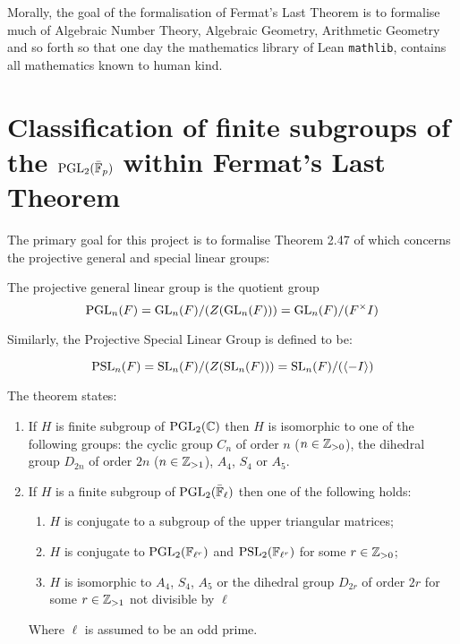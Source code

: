 Morally, the goal of the formalisation of Fermat's Last Theorem is to formalise much of Algebraic Number Theory, Algebraic Geometry, Arithmetic Geometry and so forth so that one day
the mathematics library of Lean \texttt{mathlib}, contains all mathematics known to human kind.



\section{Classification of finite subgroups of the $\operatorname{PGL}_2(\bar{\mathbb{F}}_p)$ within Fermat's Last Theorem}

The primary goal for this project is to formalise Theorem 2.47 of \cite{dtt} which 
concerns the projective general and special linear groups:

\begin{definition}
    The projective general linear group is the quotient group
    \[    
    \operatorname{PGL}_n(F) = \operatorname{GL}_n(F) / (Z(\operatorname{GL}_n(F))) = \operatorname{GL}_n(F) / (F^\times I) 
    \]
\end{definition}

Similarly, the Projective Special Linear Group is defined to be:

\begin{definition}
    \[
    \operatorname{PSL}_n(F) = \operatorname{SL}_n(F) / (Z(\operatorname{SL}_n(F))) = \operatorname{SL}_n(F) / (\langle -I\rangle)
    \]
\end{definition}

The theorem states:

\begin{enumerate}
    \item If $H$ is finite subgroup of $\operatorname{PGL}_2(\mathbb{C})$ then $H$ is isomorphic to one of the following groups: the cyclic group $C_n$ of order $n$ ($n \in \mathbb{Z}_{>0}$), the dihedral group $D_{2n}$ of order $2n$ ($n \in \mathbb{Z}_{>1}$), $A_4$, $S_4$ or $A_5$.
\item If $H$ is a finite subgroup of $\operatorname{PGL}_2(\bar{\mathbb{F}}_\ell)$ then one of the following holds:
\begin{enumerate}
    \item $H$ is conjugate to a subgroup of the upper triangular matrices;
    \item $H$ is conjugate to $\operatorname{PGL}_2(\mathbb{F}_{\ell^r})$ and $\operatorname{PSL}_2(\mathbb{F}_{\ell^{r}})$ for some $r \in \mathbb{Z}_{>0}$;
    \item $H$ is isomorphic to $A_4$, $S_4$, $A_5$ or the dihedral group $D_{2r}$ of order $2r$ for some $r \in \mathbb{Z}_{>1}$ not divisible by $\ell$

\end{enumerate}
    Where $\ell$ is assumed to be an odd prime.
\end{enumerate}

